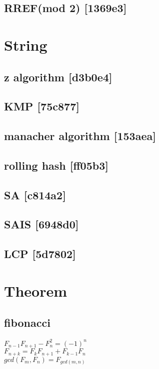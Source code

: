 \subsection{RREF(mod 2) {\footnotesize [1369e3]} }


\section{String}
\subsection{z algorithm {\footnotesize [d3b0e4]} }

\subsection{KMP {\footnotesize [75c877]} }

\subsection{manacher algorithm {\footnotesize [153aea]} }

\subsection{rolling hash {\footnotesize [ff05b3]} }

\subsection{SA {\footnotesize [c814a2]} }

\subsection{SAIS {\footnotesize [6948d0]} }

\subsection{LCP {\footnotesize [5d7802]} }


\section{Theorem}
\doublespacing
\subsection{fibonacci}
\mbox{\Large\(F_{n-1} F_{n+1} - F_n^2 = (-1)^n\)}\\
\mbox{\Large\(F_{n+k} = F_k F_{n+1} + F_{k-1} F_n\)}\\
\mbox{\Large\(gcd(F_m, F_n) = F_{gcd(m, n)}\)}
